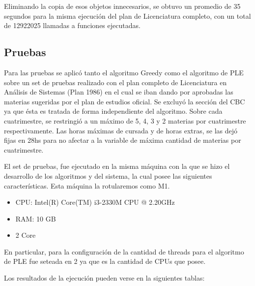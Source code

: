 \documentclass[a4paper]{article}
\begin{document}
Eliminando la copia de esos objetos innecesarios, se obtuvo un promedio de 35 segundos para la misma ejecución del plan de Licenciatura completo, con un total de 12922025 llamadas a funciones ejecutadas.


\subsection{Pruebas}

Para las pruebas se aplicó tanto el algoritmo Greedy como el algoritmo de PLE sobre un set de pruebas realizado con el plan completo de Licenciatura en Análisis de Sistemas (Plan 1986) en el cual se iban dando por aprobadas las materias sugeridas por el plan de estudios oficial. Se excluyó la sección del CBC ya que ésta es tratada de forma independiente del algoritmo. Sobre cada cuatrimestre, se restringió a un máximo de 5, 4, 3 y 2 materias por cuatrimestre respectivamente. Las horas máximas de cursada y de horas extras, se las dejó fijas en 28hs para no afectar a la variable de máxima cantidad de materias por cuatrimestre.

El set de pruebas, fue ejecutado en la misma máquina con la que se hizo el desarrollo de los algoritmos y del sistema, la cual posee las siguientes características. Esta máquina la rotularemos como M1.

\begin{itemize}
	\item CPU: Intel(R) Core(TM) i3-2330M CPU @ 2.20GHz
	\item RAM: 10 GB
	\item 2 Core
\end{itemize}

En particular, para la configuración de la cantidad de threads para el algoritmo de PLE fue seteada en 2 ya que es la cantidad de CPUs que posee.

Los resultados de la ejecución pueden verse en la siguientes tablas:
\end{document}

